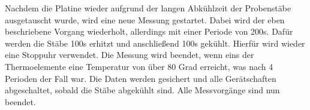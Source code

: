 \noindent Nachdem die Platine wieder aufgrund der langen Abkühlzeit der Probenstäbe ausgetauscht wurde, wird eine neue Messung gestartet.
Dabei wird der eben beschriebene Vorgang wiederholt, allerdings mit einer Periode von 200s.
Dafür werden die Stäbe 100s erhitzt und anschließend 100s gekühlt.
Hierfür wird wieder eine Stoppuhr verwendet.
Die Messung wird beendet, wenn eins der Thermoelemente eine Temperatur von über 80 Grad erreicht, was nach 4 Perioden der Fall war. 
Die Daten werden gesichert und alle Gerätschaften abgeschaltet, sobald die Stäbe abgekühlt sind.
Alle Messvorgänge sind nun beendet.
